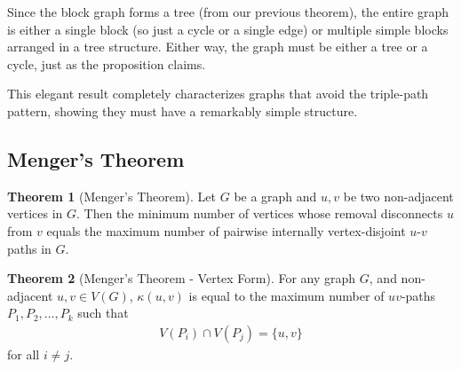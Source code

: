 \documentclass{article}
\theoremstyle{definition}
\newtheorem{theorem}{Theorem}
\begin{document}
Since the block graph forms a tree (from our previous theorem), the entire graph is either a single block (so just a cycle or a single edge) or multiple simple blocks arranged in a tree structure. Either way, the graph must be either a tree or a cycle, just as the proposition claims.

This elegant result completely characterizes graphs that avoid the triple-path pattern, showing they must have a remarkably simple structure.

\subsection{Menger's Theorem}

\begin{theorem}[Menger's Theorem]
Let $G$ be a graph and $u,v$ be two non-adjacent vertices in $G$. Then the minimum number of vertices whose removal disconnects $u$ from $v$ equals the maximum number of pairwise internally vertex-disjoint $u$-$v$ paths in $G$.
\end{theorem}

\begin{theorem}[Menger's Theorem - Vertex Form]
For any graph $G$, and non-adjacent $u, v \in V(G)$, $\kappa(u,v)$ is equal to the maximum number of $uv$-paths $P_1, P_2, \ldots, P_k$ such that 
\begin{align*}
V(P_i) \cap V(P_j) = \{u, v\}
\end{align*}
for all $i \neq j$.
\end{theorem}
\end{document}
